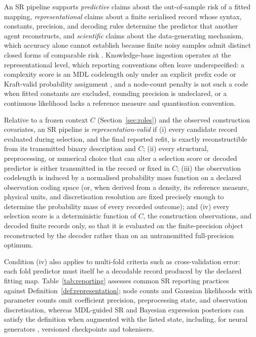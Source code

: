 An SR pipeline supports \emph{predictive} claims about the out-of-sample risk of a fitted mapping, \emph{representational} claims about a finite serialised record whose syntax, constants, precision, and decoding rules determine the predictor that another agent reconstructs, and \emph{scientific} claims about the data-generating mechanism, which accuracy alone cannot establish because finite noisy samples admit distinct closed forms of comparable risk \citep{fajardofontiveros2023limits}. Knowledge-base ingestion operates at the representational level, which reporting conventions often leave underspecified: a complexity score is an MDL codelength only under an explicit prefix code or Kraft-valid probability assignment \citep{rissanen1978,grunwald2007mdl}, and a node-count penalty is not such a code when fitted constants are excluded, rounding precision is undeclared, or a continuous likelihood lacks a reference measure and quantisation convention.

\begin{definition}\label{def:representation}
Relative to a frozen context \(C\) (Section~\ref{sec:roles}) and the observed construction covariates, an SR pipeline is \emph{representation-valid} if (i) every candidate record evaluated during selection, and the final reported refit, is exactly reconstructible from its transmitted binary description and \(C\); (ii) every structural, preprocessing, or numerical choice that can alter a selection score or decoded predictor is either transmitted in the record or fixed in \(C\); (iii) the observation codelength is induced by a normalised probability mass function on a declared observation coding space (or, when derived from a density, its reference measure, physical units, and discretisation resolution are fixed precisely enough to determine the probability mass of every recorded outcome); and (iv) every selection score is a deterministic function of \(C\), the construction observations, and decoded finite records only, so that it is evaluated on the finite-precision object reconstructed by the decoder rather than on an untransmitted full-precision optimum.
\end{definition}

Condition (iv) also applies to multi-fold criteria such as cross-validation error: each fold predictor must itself be a decodable record produced by the declared fitting map. Table~\ref{tab:reporting} assesses common SR reporting practices against Definition~\ref{def:representation}; node counts and Gaussian likelihoods with parameter counts omit coefficient precision, preprocessing state, and observation discretisation, whereas MDL-guided SR and Bayesian expression posteriors can satisfy the definition when augmented with the listed state, including, for neural generators \citep{petersen2020dsr,kamienny2022e2e}, versioned checkpoints and tokenisers.

